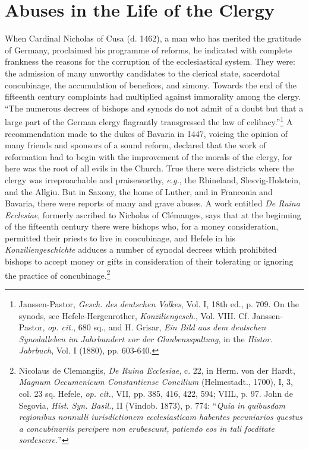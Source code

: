\section{Abuses in the Life of the Clergy}

When Cardinal Nicholas of Cusa (d. 1462), a man who has
merited the gratitude of Germany, proclaimed his programme of
reforms, he indicated with complete frankness the reasons for the
corruption of the ecclesiastical system. They were: the admission
of many unworthy candidates to the clerical state, sacerdotal concubinage,
the accumulation of benefices, and simony. Towards the
end of the fifteenth century complaints had multiplied against immorality
among the clergy. “The numerous decrees of bishops and
synods do not admit of a doubt but that a large part of the German
clergy flagrantly transgressed the law of celibacy.”\footnote
{Janssen-Pastor, \textit{Gesch. des deutschen Volkes}, Vol. I, 18th ed., p. 709. On the synods,
see Hefele-Hergenrother, \textit{Konziliengesch}., Vol. VIII. Cf. Janssen-Pastor, \textit{op. cit.}, 680 sq., and
H. Grisar, \textit{Ein Bild aus dem deutschen Synodalleben im Jahrbundert vor der Glaubensspaltung},
in the \textit{Histor. Jabrbuch}, Vol. I (1880), pp. 603-640.}
A recommendation made to the dukes of Bavaria in 1447, voicing the opinion
of many friends and sponsors of a sound reform, declared that the
work of reformation had to begin with the improvement of the
morals of the clergy, for here was the root of all evils in the Church.
True there were districts where the clergy was irreproachable and
praiseworthy, \textit{e.g.}, the Rhineland, Slesvig-Holstein, and the Allgiu.
But in Saxony, the home of Luther, and in Franconia and Bavaria,
there were reports of many and grave abuses. A work entitled \textit{De
Ruina Ecclesiae}, formerly ascribed to Nicholas of Clémanges, says
that at the beginning of the fifteenth century there were bishops
who, for a money consideration, permitted their priests to live in
concubinage, and Hefele in his \textit{Konziliengeschichte} adduces a number
of synodal decrees which prohibited bishops to accept money or
gifts in consideration of their tolerating or ignoring the practice
of concubinage.\footnote
{Nicolaus de Clemangiis, \textit{De Ruina Ecclesiae}, c. 22, in Herm. von der Hardt, \textit{Magnum
Oecumenicum Constantiense Concilium} (Helmestadt., 1700), I, 3, col. 23 sq. Hefele,
\textit{op. cit.}, VII, pp. 385, 416, 422, 594; VIIL, p. 97. John de Segovia, \textit{Hist. Syn. Basil.}, II
(Vindob. 1873), p. 774: “\textit{Quia in quibusdam regionibus nonnulli iurisdictionem ecclesiasticam habentes pecuniarios questus a concubinariis percipere non erubescunt, patiendo eos in
tali focditate sordescere.}”}

